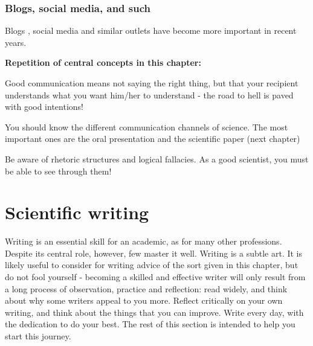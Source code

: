 \documentclass{tufte-book}
\begin{document}
\subsection{Blogs, social media, and such}

Blogs , social media and similar outlets have become more important in recent years. 


\vspace{1cm}
\begin{mdframed}[backgroundcolor=black!10,rightline=false,leftline=false]
    
\textbf{Repetition of central concepts in this chapter:} 

\begin{itemize*}
  \item Good communication means not saying the right thing, but that your recipient understands what you want him/her to understand - the road to hell is paved with good intentions!
  \item You should know the different communication channels of science. The most important ones are the oral presentation and the scientific paper (next chapter)
  \item Be aware of rhetoric structures and logical fallacies. As a good scientist, you must be able to see through them!
\end{itemize*}

\end{mdframed}


\chapter{Scientific writing}

Writing is an essential skill for an academic, as for many other professions.  Despite its central role, however, few master it well. Writing is a subtle art. It is likely useful to consider for writing advice of the sort given in this chapter, but do not fool yourself - becoming a skilled and effective writer will only result from a long process of observation, practice and reflection: read widely, and think about why some writers appeal to you more. Reflect critically on your own writing, and think about the things that you can improve. Write every day, with the dedication to do your best. The rest of this section is intended to help you start this journey. 
\end{document}
